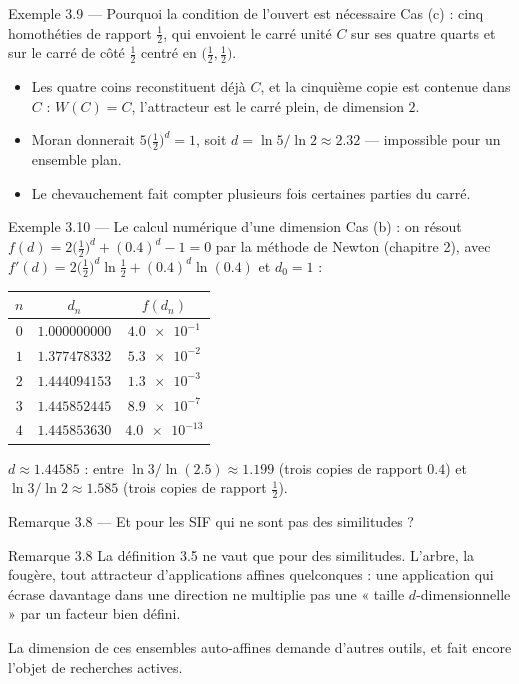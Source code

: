 \begin{frame}{Exemple 3.9 --- Pourquoi la condition de l'ouvert est nécessaire}
  \small Cas (c) : cinq homothéties de rapport $\tfrac12$, qui envoient
  le carré unité $C$ sur ses quatre quarts et sur le carré de côté
  $\tfrac12$ centré en $\big(\tfrac12,\tfrac12\big)$.
  \begin{itemize}
    \item Les quatre coins reconstituent déjà $C$, et la cinquième copie
      est contenue dans $C$ : $W(C)=C$, l'attracteur est le carré plein,
      de dimension $2$.
    \item Moran donnerait $5\big(\tfrac12\big)^d=1$, soit
      $d=\ln5/\ln2\approx\num{2.32}$ --- impossible pour un ensemble plan.
    \item Le chevauchement fait compter plusieurs fois certaines parties
      du carré.
  \end{itemize}
\end{frame}

\begin{frame}{Exemple 3.10 --- Le calcul numérique d'une dimension}
  \small Cas (b) : on résout
  $f(d) = 2\big(\tfrac12\big)^d + (\num{0.4})^d - 1 = 0$ par la méthode
  de Newton (chapitre 2), avec
  $f'(d) = 2\big(\tfrac12\big)^d\ln\tfrac12 + (\num{0.4})^d\ln(\num{0.4})$
  et $d_0=1$ :
  \begin{center}
  \small
  \begin{tabular}{ccc}
    \toprule
    $n$ & $d_n$ & $f(d_n)$ \\
    \midrule
    $0$ & $\num{1.000000000}$ & $\num{4.0e-1}$ \\
    $1$ & $\num{1.377478332}$ & $\num{5.3e-2}$ \\
    $2$ & $\num{1.444094153}$ & $\num{1.3e-3}$ \\
    $3$ & $\num{1.445852445}$ & $\num{8.9e-7}$ \\
    $4$ & $\num{1.445853630}$ & $\num{4.0e-13}$ \\
    \bottomrule
  \end{tabular}
  \end{center}
  \small $d\approx\num{1.44585}$ : entre $\ln3/\ln(\num{2.5})\approx\num{1.199}$
  (trois copies de rapport $\num{0.4}$) et $\ln3/\ln2\approx\num{1.585}$
  (trois copies de rapport $\tfrac12$).
\end{frame}

\begin{frame}{Remarque 3.8 --- Et pour les SIF qui ne sont pas des similitudes ?}
  \begin{Rem}{Remarque 3.8}
    La définition 3.5 ne vaut que pour des similitudes. L'arbre, la
    fougère, tout attracteur d'applications affines quelconques : une
    application qui écrase davantage dans une direction ne multiplie pas
    une « taille $d$-dimensionnelle » par un facteur bien défini.
    \vspace{4pt}

    La dimension de ces ensembles auto-affines demande d'autres outils,
    et fait encore l'objet de recherches actives.
  \end{Rem}
\end{frame}
